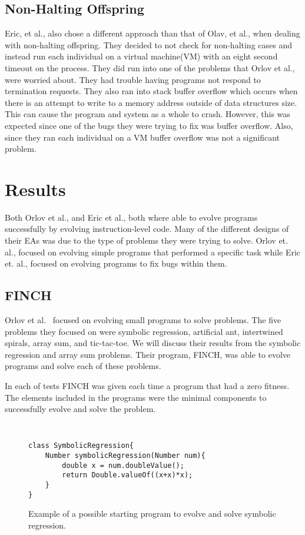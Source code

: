\documentclass{sig-alternate}
\begin{document}
\subsection{Non-Halting Offspring}

Eric, et al., also chose a different approach than that of Olav, et al., when dealing with non-halting offspring. They decided to not check for non-halting cases and instead run each individual on a virtual machine(VM) with an eight second timeout on the process. They did run into one of the problems that Orlov et al., were worried about. They had trouble having programs not respond to termination requests.
They also ran into stack buffer overflow which occurs when there is an attempt to write to a memory address outside of data structures size. This can cause the program and system as a whole to crash. However, this was expected since one of the bugs they were trying to fix was buffer overflow. Also, since they ran each individual on a VM buffer overflow was not a significant problem.




\section{Results}
Both Orlov et al., and Eric et al., both where able to evolve programs successfully by evolving instruction-level code. Many of the different designs of their EAs was due to the type of problems they were trying to solve. Orlov et. al., focused on evolving simple programs that performed a specific task while Eric et. al., focused on evolving programs to fix bugs within them.

\subsection{FINCH}
Orlov et al.~\cite{FINCH:2011} focused on evolving small programs to solve problems. The five problems they focused on were symbolic regression, artificial ant, intertwined spirals, array sum, and tic-tac-toe. We will discuss their results from the symbolic regression and array sum problems. Their program, FINCH, was able to evolve programs and solve each of these problems.

In each of tests FINCH was given each time a program that had a zero fitness. The elements included in the programs were the minimal components to successfully evolve and solve the problem.

\begin{figure}
\centering
{\tt
\begin{verbatim}
class SymbolicRegression{
    Number symbolicRegression(Number num){
        double x = num.doubleValue();
        return Double.valueOf((x+x)*x);
    }
}
\end{verbatim}
}
\caption{Example of a possible starting program to evolve and solve symbolic regression.}
\label{regression}
\end{figure}
\end{document}

